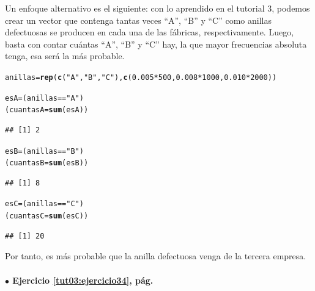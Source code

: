 \documentclass[10pt,a4paper]{article}\usepackage[]{graphicx}\usepackage[]{color}
\makeatletter
\newcommand{\hlnum}[1]{\textcolor[rgb]{0.686,0.059,0.569}{#1}}%
\newcommand{\hlstr}[1]{\textcolor[rgb]{0.192,0.494,0.8}{#1}}%
\newcommand{\hlopt}[1]{\textcolor[rgb]{0,0,0}{#1}}%
\newcommand{\hlstd}[1]{\textcolor[rgb]{0.345,0.345,0.345}{#1}}%
\newcommand{\hlkwb}[1]{\textcolor[rgb]{0.69,0.353,0.396}{#1}}%
\newcommand{\hlkwd}[1]{\textcolor[rgb]{0.737,0.353,0.396}{\textbf{#1}}}%
\newenvironment{kframe}{%
 \def\at@end@of@kframe{}%
 \ifinner\ifhmode%
  \def\at@end@of@kframe{\end{minipage}}%
  \begin{minipage}{\columnwidth}%
 \fi\fi%
 \def\FrameCommand##1{\hskip\@totalleftmargin \hskip-\fboxsep
 \colorbox{shadecolor}{##1}\hskip-\fboxsep
     \hskip-\linewidth \hskip-\@totalleftmargin \hskip\columnwidth}%
 \MakeFramed {\advance\hsize-\width
   \@totalleftmargin\z@ \linewidth\hsize
   \@setminipage}}%
 {\par\unskip\endMakeFramed%
 \at@end@of@kframe}
\newenvironment{knitrout}{}{} %
\newcounter {cont01}
\makeatother
\begin{document}
Un enfoque alternativo es el siguiente: con lo aprendido en el tutorial 3, podemos crear un vector que contenga tantas veces ``A'', ``B'' y ``C'' 
como anillas defectuosas se producen en cada una de las fábricas, respectivamente. Luego, basta con contar cuántas ``A'',  ``B'' y ``C'' hay, la que mayor frecuencias absoluta tenga, esa será la más probable. 
\begin{knitrout}
\color{fgcolor}\begin{kframe}
\begin{alltt}
\hlstd{anillas}\hlkwb{=}\hlkwd{rep}\hlstd{(}\hlkwd{c}\hlstd{(}\hlstr{"A"}\hlstd{,}\hlstr{"B"}\hlstd{,} \hlstr{"C"}\hlstd{),}\hlkwd{c}\hlstd{(}\hlnum{0.005}\hlopt{*}\hlnum{500}\hlstd{,}\hlnum{0.008}\hlopt{*}\hlnum{1000}\hlstd{,}\hlnum{0.010}\hlopt{*}\hlnum{2000}\hlstd{))}

\hlstd{esA}\hlkwb{=} \hlstd{(anillas}\hlopt{==}\hlstr{"A"}\hlstd{)}
\hlstd{(cuantasA}\hlkwb{=}\hlkwd{sum}\hlstd{(esA))}
\end{alltt}
\begin{verbatim}
## [1] 2
\end{verbatim}
\begin{alltt}
\hlstd{esB}\hlkwb{=} \hlstd{(anillas}\hlopt{==}\hlstr{"B"}\hlstd{)}
\hlstd{(cuantasB}\hlkwb{=}\hlkwd{sum}\hlstd{(esB))}
\end{alltt}
\begin{verbatim}
## [1] 8
\end{verbatim}
\begin{alltt}
\hlstd{esC}\hlkwb{=} \hlstd{(anillas}\hlopt{==}\hlstr{"C"}\hlstd{)}
\hlstd{(cuantasC}\hlkwb{=}\hlkwd{sum}\hlstd{(esC))}
\end{alltt}
\begin{verbatim}
## [1] 20
\end{verbatim}
\end{kframe}
\end{knitrout}

Por tanto, es m\'as probable que la anilla defectuosa venga de la tercera empresa.


\paragraph{\bf $\bullet$ Ejercicio \ref{tut03:ejercicio34}, pág. \pageref{tut03:ejercicio34}}
\label{tut03:ejercicio34:sol}\quad\\
\end{document}
